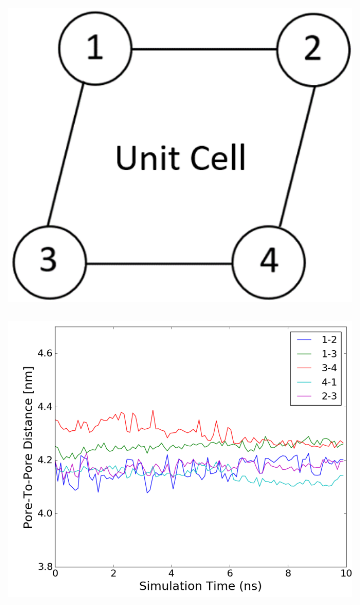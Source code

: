 \documentclass{article}
\begin{document}
  \begin{figure}[H]
	\centering
	\begin{subfigure}{0.31\textwidth}
		\centering
		\includegraphics[width=\textwidth]{p2p_diagram.PNG}
		\caption{}\label{fig:p2p_diagram}
	\end{subfigure}
		\begin{subfigure}{0.31\textwidth}
		\centering
		\includegraphics[width=\textwidth]{no_xlink_p2p.png}
		\caption{}\label{fig:no_xlink_p2p}
	\end{subfigure}
		\begin{subfigure}{0.31\textwidth}

\end{subfigure}
\end{figure}
\end{document}
